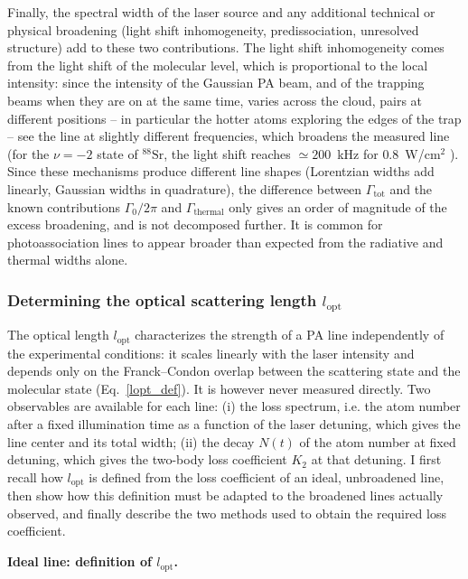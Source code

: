 Finally, the spectral width of the laser source and any additional technical or
physical broadening (light shift inhomogeneity, predissociation, unresolved
structure) add to these two contributions. The light shift inhomogeneity comes from the
light shift of the molecular level, which is proportional to the local intensity: since
the intensity of the Gaussian PA beam, and of the trapping beams when they are on at the
same time, varies across the cloud, pairs at different positions -- in particular the
hotter atoms exploring the edges of the trap -- see the line at slightly different
frequencies, which broadens the measured line (for the $\nu=-2$ state of
$^{88}\text{Sr}$, the light shift reaches $\simeq200$~kHz for $0.8$~W/cm$^2$
\cite{blatt_measurement_2011}). Since these mechanisms produce
different line shapes (Lorentzian widths add linearly, Gaussian widths in
quadrature), the difference between $\Gamma_{\text{tot}}$ and the known
contributions $\Gamma_0/2\pi$ and $\Gamma_{\text{thermal}}$ only gives an order of
magnitude of the excess broadening, and is not decomposed further. It is common
for photoassociation lines to appear broader than expected from the radiative and
thermal widths alone.


\subsubsection{Determining the optical scattering length $l_{\text{opt}}$}
\label{sec:determining_lopt}

The optical length $l_{\text{opt}}$ characterizes the strength of a PA line
independently of the experimental conditions: it scales linearly with the laser
intensity and depends only on the Franck--Condon overlap between the scattering
state and the molecular state (Eq.~\ref{lopt_def}). It is however never measured
directly. Two observables are available for each line: (i) the loss spectrum,
i.e. the atom number after a fixed illumination time as a function of the laser
detuning, which gives the line center and its total width; (ii) the decay $N(t)$
of the atom number at fixed detuning, which gives the two-body loss coefficient
$K_2$ at that detuning. I first recall how $l_{\text{opt}}$ is defined from the
loss coefficient of an ideal, unbroadened line, then show how this definition
must be adapted to the broadened lines actually observed, and finally describe
the two methods used to obtain the required loss coefficient.

\textbf{Ideal line: definition of $l_{\text{opt}}$.}

